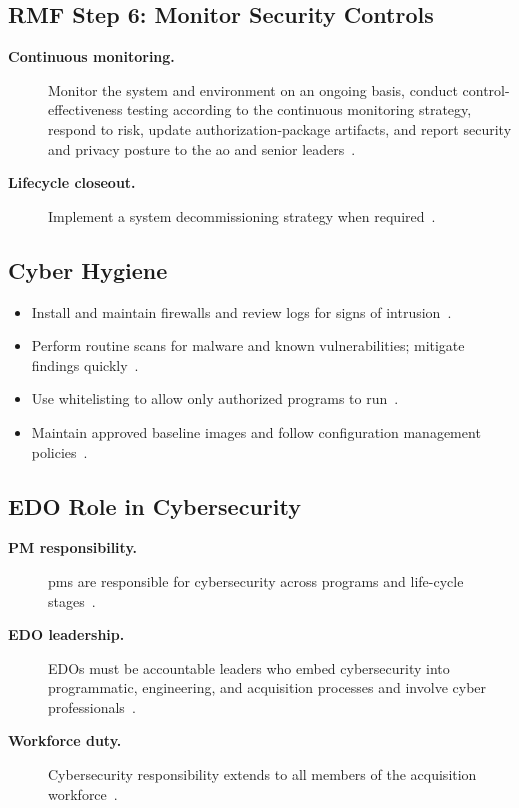 \documentclass[../main.tex]{subfiles}
\begin{document}
\subsection{RMF Step 6: Monitor Security Controls}
\begin{description}
  \item[\textbf{Continuous monitoring.}] Monitor the system and environment on an ongoing basis, conduct control-effectiveness testing according to the continuous monitoring strategy, respond to risk, update authorization-package artifacts, and report security and privacy posture to the \ac{ao} and senior leaders~\autocite{DoDI8510-01,edo-3-4-3-cybersecurity-awareness-2025}.
  \item[\textbf{Lifecycle closeout.}] Implement a system decommissioning strategy when required~\autocite{edo-3-4-3-cybersecurity-awareness-2025}.
\end{description}

\subsection{Cyber Hygiene}
\begin{itemize}
  \item Install and maintain firewalls and review logs for signs of intrusion~\autocite{edo-3-4-3-cybersecurity-awareness-2025}.
  \item Perform routine scans for malware and known vulnerabilities; mitigate findings quickly~\autocite{edo-3-4-3-cybersecurity-awareness-2025}.
  \item Use whitelisting to allow only authorized programs to run~\autocite{edo-3-4-3-cybersecurity-awareness-2025}.
  \item Maintain approved baseline images and follow configuration management policies~\autocite{edo-3-4-3-cybersecurity-awareness-2025}.
\end{itemize}

\subsection{EDO Role in Cybersecurity}
\begin{description}
  \item[\textbf{PM responsibility.}] \acp{pm} are responsible for cybersecurity across programs and life-cycle stages~\autocite{edo-3-4-3-cybersecurity-awareness-2025}.
  \item[\textbf{EDO leadership.}] EDOs must be accountable leaders who embed cybersecurity into programmatic, engineering, and acquisition processes and involve cyber professionals~\autocite{edo-3-4-3-cybersecurity-awareness-2025}.
  \item[\textbf{Workforce duty.}] Cybersecurity responsibility extends to all members of the acquisition workforce~\autocite{edo-3-4-3-cybersecurity-awareness-2025}.
\end{description}
\end{document}
